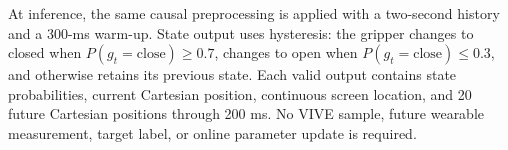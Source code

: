 At inference, the same causal preprocessing is applied with a two-second
history and a 300-ms warm-up. State output uses hysteresis: the gripper changes
to closed when $P(g_t=\mathrm{close})\geq0.7$, changes to open when
$P(g_t=\mathrm{close})\leq0.3$, and otherwise retains its previous state. Each
valid output contains state probabilities, current Cartesian position,
continuous screen location, and 20 future Cartesian positions through 200 ms.
No VIVE sample, future wearable measurement, target label, or online parameter
update is required.
